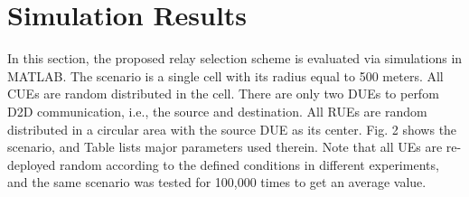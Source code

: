 \documentclass[conference]{IEEEtran}
\begin{document}
\section{Simulation Results}
In this section, the proposed relay selection scheme is evaluated via simulations in MATLAB. The scenario is a single cell with its radius equal to 500 meters. All CUEs are random distributed in the cell. There are only two DUEs to perfom D2D communication, i.e., the source and destination. All RUEs are random distributed in a circular area with the source DUE as its center. Fig. 2 shows the scenario, and Table \uppercase\expandafter{} lists major parameters used therein. Note that all UEs are re-deployed random according to the defined conditions in different experiments, and the same scenario was tested for 100,000 times to get an average value.
\end{document}
